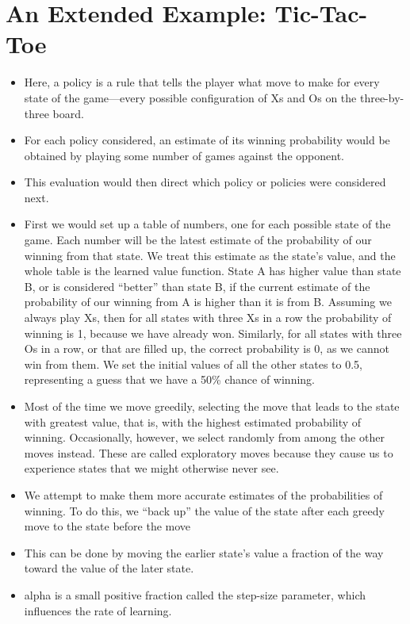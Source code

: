 \documentclass{article}
\begin{document}
\section{An Extended Example: Tic-Tac-Toe}
\begin{itemize}
    \item Here, a policy is a rule that tells the player what move to make for every state of the game—every possible configuration of Xs and Os on the three-by-three board.
    \item For each policy considered, an estimate of its winning probability would be obtained by playing some number of games against the opponent.
    \item This evaluation would then direct which policy or policies were considered next.
    \item First we would set up a table of numbers, one for each possible state of the game. Each number will be the latest estimate of the probability of our winning from that state. We treat this estimate as the state’s value, and the whole table is the learned value function. State A has higher value than state B, or is considered “better” than state B, if the current estimate of the probability of our winning from A is higher than it is from B. Assuming we always play Xs, then for all states with three Xs in a row the probability of winning is 1, because we have already won. Similarly, for all states with three Os in a row, or that are filled up, the correct probability is 0, as we cannot win from them. We set the initial values of all the other states to 0.5, representing a guess that we have a 50\% chance of winning.
    \item Most of the time we move greedily, selecting the move that leads to the state with greatest value, that is, with the highest estimated probability of winning. Occasionally, however, we select randomly from among the other moves instead. These are called exploratory moves because they cause us to experience states that we might otherwise never see.
    \item We attempt to make them more accurate estimates of the probabilities of winning. To do this, we “back up” the value of the state after each greedy move to the state before the move
    \item This can be done by moving the earlier state's value a fraction of the way toward the value of the later state.
    \item alpha is a small positive fraction called the step-size parameter, which influences the rate of learning.

\end{itemize}
\end{document}

